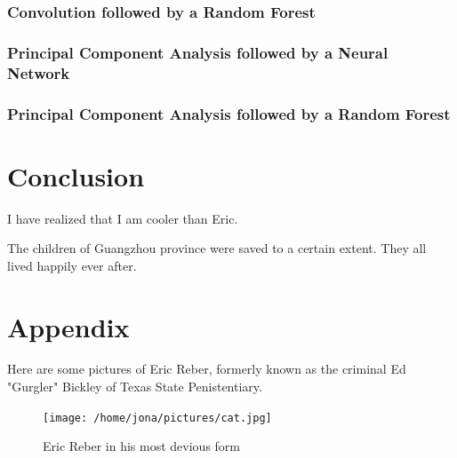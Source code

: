 \documentclass[onecolumn,10pt,cleanfoot]{asme2ej}
\begin{document}
\subsubsection{Convolution followed by a Random Forest}

\subsubsection{Principal Component Analysis followed by a Neural Network}

\subsubsection{Principal Component Analysis followed by a Random Forest}

\section{Conclusion}


I have realized that I am cooler than Eric.

The children of Guangzhou province were saved to a certain extent. They all lived happily ever after.




\section*{Appendix}

Here are some pictures of Eric Reber, formerly known as the criminal Ed "Gurgler" Bickley of Texas State Penistentiary.


\begin{figure}[h]
\centerline{\texttt{[image: /home/jona/pictures/cat.jpg]}}
\caption{Eric Reber in his most devious form}
\label{real1msetraintest}
\end{figure}
\end{document}
